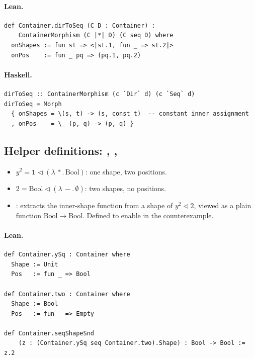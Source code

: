 \documentclass[11pt,a4paper]{article}
\begin{document}
\paragraph{Lean.}
\begin{lstlisting}[style=lean]
def Container.dirToSeq (C D : Container) :
    ContainerMorphism (C |*| D) (C seq D) where
  onShapes := fun st => <|st.1, fun _ => st.2|>
  onPos    := fun _ pq => (pq.1, pq.2)
\end{lstlisting}

\paragraph{Haskell.}
\begin{lstlisting}[style=haskell]
dirToSeq :: ContainerMorphism (c `Dir` d) (c `Seq` d)
dirToSeq = Morph
  { onShapes = \(s, t) -> (s, const t)  -- constant inner assignment
  , onPos    = \_ (p, q) -> (p, q) }
\end{lstlisting}


\subsection{Helper definitions: , , }

\begin{defn}
\begin{itemize}
  \item $y^2 = \mathbf{1} \triangleleft (\lambda\,\ast.\,\mathrm{Bool})$:
    one shape, two positions.
  \item $2 = \mathrm{Bool} \triangleleft (\lambda\,{-}.\,\emptyset)$:
    two shapes, no positions.
  \item {}: extracts the inner-shape function from a shape of
    $y^2 \triangleleft 2$, viewed as a plain function $\mathrm{Bool} \to
    \mathrm{Bool}$.  Defined to enable  in the counterexample.
\end{itemize}
\end{defn}

\paragraph{Lean.}
\begin{lstlisting}[style=lean]
def Container.ySq : Container where
  Shape := Unit
  Pos   := fun _ => Bool

def Container.two : Container where
  Shape := Bool
  Pos   := fun _ => Empty

def Container.seqShapeSnd
    (z : (Container.ySq seq Container.two).Shape) : Bool -> Bool := z.2
\end{lstlisting}
\end{document}
